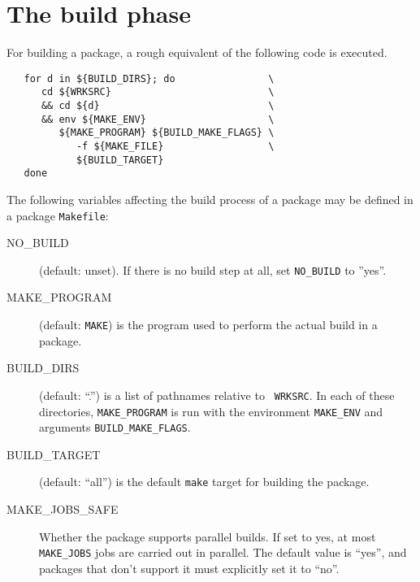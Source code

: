 %
%
%
%
%

\section{The build phase} %
\label{section:buildvars}

For building a package, a rough equivalent of the following code is executed.
\begin{verbatim}
   for d in ${BUILD_DIRS}; do                \
      cd ${WRKSRC}                           \
      && cd ${d}                             \
      && env ${MAKE_ENV}                     \
         ${MAKE_PROGRAM} ${BUILD_MAKE_FLAGS} \
            -f ${MAKE_FILE}                  \
            ${BUILD_TARGET}
   done
\end{verbatim}

The following variables affecting the build process of a package may be defined
in a package {\tt Makefile}:

\begin{description}
   \item[NO\_BUILD] (default: unset). If there is no build step at all, set
   {\tt NO\_BUILD} to ''yes''.

   \smallbreak
   \item[MAKE\_PROGRAM] (default: {\tt MAKE}) is the program used to perform
   the actual build in a package.

   \smallbreak
   \item[BUILD\_DIRS] (default: ``.'') is a list of pathnames relative to {\tt
   WRKSRC}. In each of these directories, {\tt MAKE\_PROGRAM} is run with the
   environment {\tt MAKE\_ENV} and arguments {\tt BUILD\_MAKE\_FLAGS}.

   \smallbreak
   \item[BUILD\_TARGET] (default: ``all'') is the default {\tt make} target for
   building the package.

   \smallbreak
   \item[MAKE\_JOBS\_SAFE] Whether the package supports parallel builds. If set
   to yes, at most {\tt MAKE\_JOBS} jobs are carried out in parallel. The
   default value is ``yes'', and packages that don't support it must explicitly
   set it to ``no''.
\end{description}
